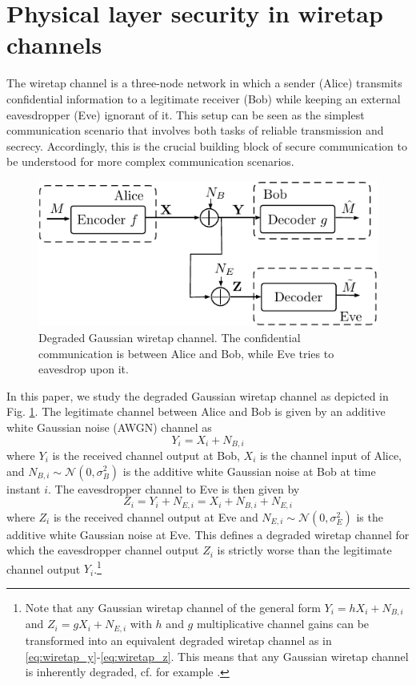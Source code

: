 \documentclass[conference]{IEEEtran}
\begin{document}
\section{Physical layer security in wiretap channels}
\label{InfoThModel}

The wiretap channel is a three-node network in which a sender (Alice) transmits confidential information to a legitimate receiver (Bob) while keeping an external eavesdropper (Eve) ignorant of it. This setup can be seen as the simplest communication scenario that involves both tasks of reliable transmission and secrecy. Accordingly, this is the crucial building block of secure communication to be understood for more complex communication scenarios.

\begin{figure}
\centering
\includegraphics[scale=0.8]{G-WTC-D2.pdf}
\caption{Degraded Gaussian wiretap channel. The confidential communication is between Alice and Bob, while Eve tries to eavesdrop upon it.}
\label{Wiretap-degraded-classical}
\end{figure}

In this paper, we study the degraded Gaussian wiretap channel as depicted in Fig. \ref{Wiretap-degraded-classical}. The legitimate channel between Alice and Bob is given by an additive white Gaussian noise (AWGN) channel as
\begin{equation}
	Y_i=X_i+N_{B,i}
    \label{eq:wiretap_y}
\end{equation}
where $Y_i$ is the received channel output at Bob, $X_i$ is the channel input of Alice, and $N_{B,i}\sim \mathcal{N}(0,\sigma_B^2)$ is the additive white Gaussian noise at Bob at time instant $i$. The eavesdropper channel to Eve is then given by
\begin{equation}
	Z_i=Y_i+N_{E,i} = X_i+N_{B,i}+N_{E,i}
    \label{eq:wiretap_z}
\end{equation}
where $Z_i$ is the received channel output at Eve and $N_{E,i}\sim \mathcal{N}(0,\sigma_E^2)$ is the additive white Gaussian noise at Eve. This defines a degraded wiretap channel for which the eavesdropper channel output $Z_i$ is strictly worse than the legitimate channel output $Y_i$.\footnote{Note that any Gaussian wiretap channel of the general form $Y_i=hX_i+N_{B,i}$ and $Z_i=gX_i+N_{E,i}$ with $h$ and $g$ multiplicative channel gains can be transformed into an equivalent degraded wiretap channel as in \eqref{eq:wiretap_y}-\eqref{eq:wiretap_z}. This means that any Gaussian wiretap channel is inherently degraded, cf. for example \cite[Sec. 5.1]{BlochBarros-2011-PhysicalLayerSecurity}.}
\end{document}
